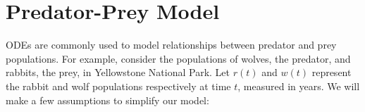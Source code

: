 \label{lab:Weightchange}



\section*{Predator-Prey Model} 
ODEs are commonly used to model relationships between predator and prey populations. For example, consider the populations of wolves, the predator, and rabbits, the prey, in Yellowstone National Park. Let $r(t)$ and $w(t)$ represent the rabbit and wolf populations respectively at time $t$, measured in years. 
We will make a few assumptions to simplify our model:

